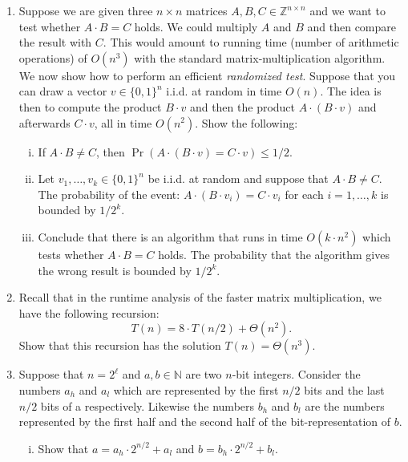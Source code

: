 \documentclass[11pt]{article}
\institute{\'Ecole Polytechnique F\'ed\'erale de Lausanne}
\renewcommand{\leq}{\leqslant}
\begin{document}
\makeheader

\begin{enumerate}[1)]

\item Suppose we are given three $n \times n$ matrices $A, B, C \in \mathbb{Z}^{n \times n}$ and we want to test whether $A \cdot B = C$ holds. 
We could multiply $A$ and $B$ and then compare the result with $C$. This would amount to running time (number of arithmetic operations) of $O(n^3)$ with the standard matrix-multiplication algorithm. We now show how to perform an efficient \emph{randomized test}. Suppose that you can draw a vector $v \in \{0, 1\}^n$ i.i.d. at random in time $O(n)$. The idea is then to compute the product $B \cdot v$ and then the product $A \cdot (B \cdot v)$ and afterwards $C \cdot v$, all in time $O(n^2)$. Show the following:
\begin{enumerate}[i)]
	\item If $A \cdot B \neq C$, then $\Pr(A \cdot (B \cdot v) = C \cdot v) \leq 1/2$.

	\item Let $v_1, \ldots, v_k \in \{0, 1\}^n$ be i.i.d. at random and suppose that $A \cdot B \neq C$.
	The probability of the event: $A \cdot (B \cdot v_i) = C \cdot v_i$ for each $i = 1, \ldots, k$ is bounded by $1/2^k$.

	\item Conclude that there is an algorithm that runs in time $O(k \cdot n^2)$ which tests whether $A \cdot B = C$ holds. The probability that the algorithm gives the wrong result is bounded by $1/2^k$.
\end{enumerate}

\item Recall that in the runtime analysis of the faster matrix multiplication, we have the following recursion: 
\[
T(n) = 8 \cdot T(n/2) + \Theta(n^2).
\]
Show that this recursion has the solution $T(n) = \Theta(n^3)$.


\item Suppose that $n=2^\ell$ and $a, b \in \mathbb{N}$ are two $n$-bit integers. Consider the numbers $a_h$ and $a_l$ which are represented by the first $n/2$ bits and the last $n/2$ bits of a respectively. Likewise the numbers $b_h$ and $b_l$ are the numbers represented by the first half and the second half of the bit-representation of $b$.
\begin{enumerate}[i)]
	\item Show that $a = a_h \cdot 2^{n/2} + a_l$ and $b = b_h \cdot 2^{n/2} + b_l$.


\end{enumerate}
\end{enumerate}
\end{document}
